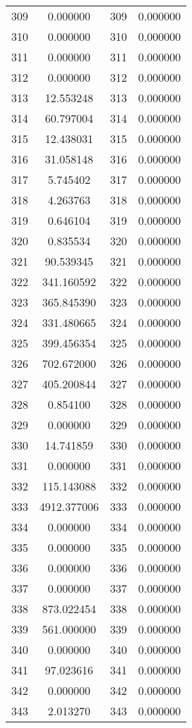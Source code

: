\documentclass[12pt]{article}
\begin{document}
\begin{longtable}{@{}cccc@{}}
309 & 0.000000 & 309 & 0.000000 \\
310 & 0.000000 & 310 & 0.000000 \\
311 & 0.000000 & 311 & 0.000000 \\
312 & 0.000000 & 312 & 0.000000 \\
313 & 12.553248 & 313 & 0.000000 \\
314 & 60.797004 & 314 & 0.000000 \\
315 & 12.438031 & 315 & 0.000000 \\
316 & 31.058148 & 316 & 0.000000 \\
317 & 5.745402 & 317 & 0.000000 \\
318 & 4.263763 & 318 & 0.000000 \\
319 & 0.646104 & 319 & 0.000000 \\
320 & 0.835534 & 320 & 0.000000 \\
321 & 90.539345 & 321 & 0.000000 \\
322 & 341.160592 & 322 & 0.000000 \\
323 & 365.845390 & 323 & 0.000000 \\
324 & 331.480665 & 324 & 0.000000 \\
325 & 399.456354 & 325 & 0.000000 \\
326 & 702.672000 & 326 & 0.000000 \\
327 & 405.200844 & 327 & 0.000000 \\
328 & 0.854100 & 328 & 0.000000 \\
329 & 0.000000 & 329 & 0.000000 \\
330 & 14.741859 & 330 & 0.000000 \\
331 & 0.000000 & 331 & 0.000000 \\
332 & 115.143088 & 332 & 0.000000 \\
333 & 4912.377006 & 333 & 0.000000 \\
334 & 0.000000 & 334 & 0.000000 \\
335 & 0.000000 & 335 & 0.000000 \\
336 & 0.000000 & 336 & 0.000000 \\
337 & 0.000000 & 337 & 0.000000 \\
338 & 873.022454 & 338 & 0.000000 \\
339 & 561.000000 & 339 & 0.000000 \\
340 & 0.000000 & 340 & 0.000000 \\
341 & 97.023616 & 341 & 0.000000 \\
342 & 0.000000 & 342 & 0.000000 \\
343 & 2.013270 & 343 & 0.000000 \\

\end{longtable}
\end{document}
